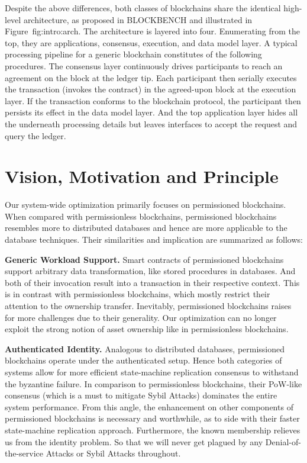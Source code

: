 Despite the above differences, both classes of blockchains share the identical high-level architecture, as proposed in BLOCKBENCH and illustrated in Figure~{fig:intro:arch}. 
The architecture is layered into four. Enumerating from the top, they are applications, consensus, execution, and data model layer. 
A typical processing pipeline for a generic blockchain constitutes of the following procedures. 
The consensus layer continuously drives participants to reach an agreement on the block at the ledger tip. 
Each participant then serially executes the transaction (invokes the contract) in the agreed-upon block at the execution layer.
If the transaction conforms to the blockchain protocol, the participant then persists its effect in the data model layer. 
And the top application layer hides all the underneath processing details but leaves interfaces to accept the request and query the ledger. 

\section{Vision, Motivation and Principle}

Our system-wide optimization primarily focuses on permissioned blockchains.
When compared with permissionless blockchains, permissioned blockchains resembles more to distributed databases and hence are more applicable to the database techniques.  
Their similarities and implication are summarized as follows: 

\textbf{Generic Workload Support. } 
Smart contracts of permissioned blockchains support arbitrary data transformation, like stored procedures in databases. And both of their invocation result into a transaction in their respective context. 
This is in contrast with permissionless blockchains, which mostly restrict their attention to the ownership transfer. 
Inevitably, permissioned blockchains raises for more challenges due to their generality.
Our optimization can no longer exploit the strong notion of asset ownership like in permissionless blockchains. 

\textbf{Authenticated Identity. } 
Analogous to distributed databases, permissioned blockchains operate under the authenticated setup.
Hence both categories of systems allow for more efficient state-machine replication consensus to withstand the byzantine failure. 
In comparison to permissionless blockchains, their PoW-like consensus (which is a must to mitigate Sybil Attacks) dominates the entire system performance. 
From this angle, the enhancement on other components of permissioned blockchains is necessary and worthwhile, as to side with their faster state-machine replication approach. 
Furthermore, the known membership relieves us from the identity problem. 
So that we will never get plagued by any Denial-of-the-service Attacks or Sybil Attacks throughout. 

